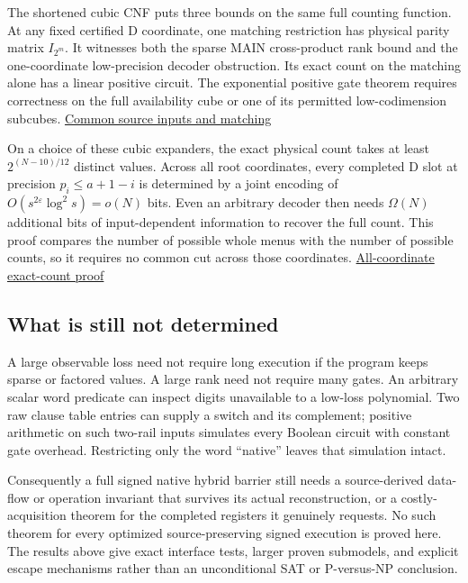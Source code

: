 \documentclass[11pt,a4paper]{article}
\begin{document}
The shortened cubic CNF puts three bounds on the same full counting
function. At any fixed certified D coordinate, one matching restriction
has physical parity matrix \(I_{2^m}\). It witnesses both the sparse
MAIN cross-product rank bound and the one-coordinate low-precision
decoder obstruction. Its exact count on the matching alone has a linear
positive circuit. The exponential positive gate theorem requires
correctness on the full availability cube or one of its permitted
low-codimension subcubes. \hyperref[v8-section-common-native-family]{Common
source inputs and matching}

On a choice of these cubic expanders, the exact physical count takes at
least \(2^{(N-10)/12}\) distinct values. Across all root coordinates,
every completed D slot at precision \(p_i\le a+1-i\) is determined by a
joint encoding of \(O(s^{2\varepsilon}\log^2s)=o(N)\) bits. Even an
arbitrary decoder then needs \(\Omega(N)\) additional bits of
input-dependent information to recover the full count. This proof
compares the number of possible whole menus with the number of possible
counts, so it requires no common cut across those coordinates.
\hyperref[v8-section-pooled-menu-barrier]{All-coordinate exact-count proof}

\subsection{What is still not
determined}\label{v8-what-is-still-not-determined}

A large observable loss need not require long execution if the program
keeps sparse or factored values. A large rank need not require many
gates. An arbitrary scalar word predicate can inspect digits unavailable
to a low-loss polynomial. Two raw clause table entries can supply a
switch and its complement; positive arithmetic on such two-rail inputs
simulates every Boolean circuit with constant gate overhead. Restricting
only the word ``native'' leaves that simulation intact.

Consequently a full signed native hybrid barrier still needs a
source-derived data-flow or operation invariant that survives its actual
reconstruction, or a costly-acquisition theorem for the completed
registers it genuinely requests. No such theorem for every optimized
source-preserving signed execution is proved here. The results above
give exact interface tests, larger proven submodels, and explicit escape
mechanisms rather than an unconditional SAT or P-versus-NP conclusion.
\end{document}
